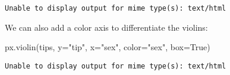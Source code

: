\documentclass[
  letterpaper,
  DIV=11,
  numbers=noendperiod]{scrreprt}
\newenvironment{Shaded}{\begin{snugshade}}{\end{snugshade}}
\newcommand{\NormalTok}[1]{\textcolor[rgb]{0.00,0.23,0.31}{#1}}
\newcommand{\OperatorTok}[1]{\textcolor[rgb]{0.37,0.37,0.37}{#1}}
\newcommand{\StringTok}[1]{\textcolor[rgb]{0.13,0.47,0.30}{#1}}
\newcommand{\VariableTok}[1]{\textcolor[rgb]{0.07,0.07,0.07}{#1}}
\begin{document}
\begin{verbatim}
Unable to display output for mime type(s): text/html
\end{verbatim}

We can also add a color axis to differentiate the violins:

\begin{Shaded}
\begin{Highlighting}[]
\NormalTok{px.violin(tips, y}\OperatorTok{=}\StringTok{"tip"}\NormalTok{, x}\OperatorTok{=}\StringTok{"sex"}\NormalTok{, color}\OperatorTok{=}\StringTok{"sex"}\NormalTok{, box}\OperatorTok{=}\VariableTok{True}\NormalTok{)}
\end{Highlighting}
\end{Shaded}

\begin{verbatim}
Unable to display output for mime type(s): text/html
\end{verbatim}
\end{document}
